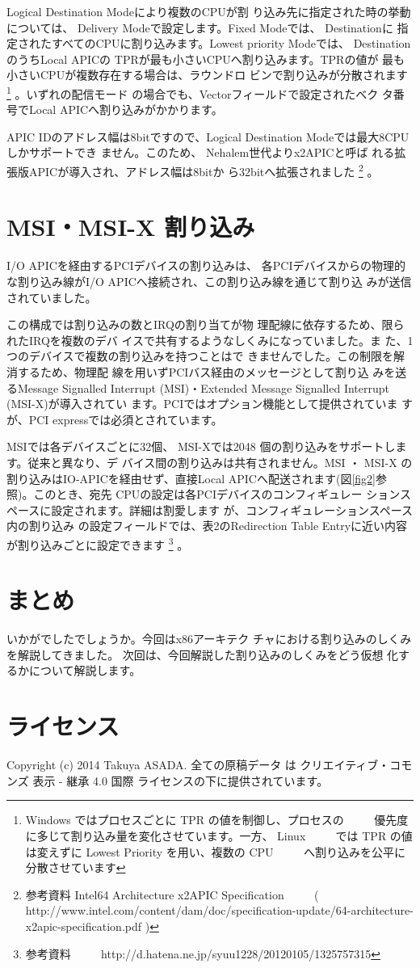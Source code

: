  Logical Destination Modeにより複数のCPUが割
り込み先に指定された時の挙動については、 Delivery
Modeで設定します。Fixed Modeでは、 Destinationに
指定されたすべてのCPUに割り込みます。Lowest
priority Modeでは、 DestinationのうちLocal APICの
TPRが最も小さいCPUへ割り込みます。TPRの値が
最も小さいCPUが複数存在する場合は、ラウンドロ
ビンで割り込みが分散されます
\footnote{Windows ではプロセスごとに TPR の値を制御し、プロセスの
　　   優先度に多じて割り込み量を変化させています。一方、 Linux
　　   では TPR の値は変えずに Lowest Priority を用い、複数の CPU
　　   へ割り込みを公平に分散させています}
。いずれの配信モード
の場合でも、Vectorフィールドで設定されたベク
タ番号でLocal APICへ割り込みがかかります。

 APIC IDのアドレス幅は8bitですので、Logical
Destination Modeでは最大8CPUしかサポートでき
ません。このため、 Nehalem世代よりx2APICと呼ば
れる拡張版APICが導入され、アドレス幅は8bitか
ら32bitへ拡張されました
\footnote{参考資料 Intel64 Architecture x2APIC Specification
　　   ( http://www.intel.com/content/dam/doc/specification-update/64-architecture-x2apic-specification.pdf )}
。

\section{MSI・MSI-X 割り込み}

 I/O APICを経由するPCIデバイスの割り込みは、
各PCIデバイスからの物理的な割り込み線がI/O
APICへ接続され、この割り込み線を通じて割り込
みが送信されていました。

 この構成では割り込みの数とIRQの割り当てが物
理配線に依存するため、限られたIRQを複数のデバ
イスで共有するようなしくみになっていました。ま
た、1つのデバイスで複数の割り込みを持つことはで
きませんでした。この制限を解消するため、物理配
線を用いずPCIバス経由のメッセージとして割り込
みを送るMessage Signalled Interrupt (MSI)・Extended
Message Signalled Interrupt (MSI-X)が導入されてい
ます。PCIではオプション機能として提供されていま
すが、PCI expressでは必須とされています。

 MSIでは各デバイスごとに32個、 MSI-Xでは2048
個の割り込みをサポートします。従来と異なり、デ
バイス間の割り込みは共有されません。MSI ・ MSI-X
の割り込みはIO-APICを経由せず、直接Local
APICへ配送されます(図\ref{fig2}参照)。このとき、宛先
CPUの設定は各PCIデバイスのコンフィギュレー
ションスペースに設定されます。詳細は割愛します
が、コンフィギュレーションスペース内の割り込み
の設定フィールドでは、表2のRedirection Table
Entryに近い内容が割り込みごとに設定できます
\footnote{参考資料
　　   http://d.hatena.ne.jp/syuu1228/20120105/1325757315}
。

\section{まとめ}

 いかがでしたでしょうか。今回はx86アーキテク
チャにおける割り込みのしくみを解説してきました。
次回は、今回解説した割り込みのしくみをどう仮想
化するかについて解説します。

\section{ライセンス}
Copyright (c) 2014 Takuya ASADA.
全ての原稿データ は クリエイティブ・コモンズ 表示 - 継承 4.0 国際 ライセンスの下に提供されています。


